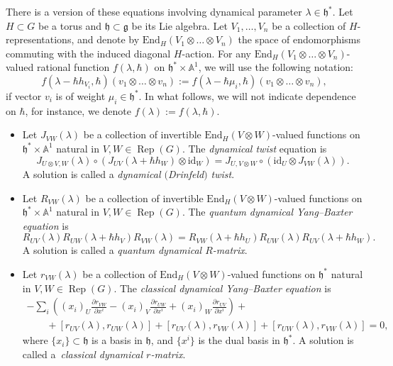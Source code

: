 \documentclass[pdftex]{sigma}
\numberwithin{equation}{section}
\newcommand{\g}{\mathfrak{g}}
\newcommand{\h}{\mathfrak{h}}
\newcommand{\End}{\mathrm{End}}
\newcommand{\id}{\mathrm{id}}
\DeclareMathOperator{\Rep}{Rep}
\begin{document}
	There is a version of these equations involving dynamical parameter $\lambda \in \h^*$. Let $H \subset G$ be a torus and $\h \subset \g$ be its Lie algebra. Let $V_1,\dots,V_n$ be a collection of $H$-representations, and denote by $\End_{H}(V_1 \otimes \dots \otimes V_n)$ the space of endomorphisms commuting with the induced diagonal $H$-action. For any $\End_{H}(V_1 \otimes \dots \otimes V_n)$-valued rational function $f(\lambda,\hbar)$ on $\h^*\times \mathbb{A}^1$, we will use the following notation:
	\[
	f(\lambda-\hbar h_{V_i},\hbar) (v_1 \otimes \dots \otimes v_n) := f(\lambda - \hbar \mu_i,\hbar) (v_1\otimes \dots \otimes v_n),
	\]
	if vector $v_i$ is of weight $\mu_i \in \h^*$. In what follows, we will not indicate dependence on $\hbar$, for instance, we denote $f(\lambda):=f(\lambda,\hbar)$.
	
	\begin{Definition}\qquad
		\label{def::all_dynamical}
		\begin{itemize}\itemsep=0pt
			\item Let $J_{VW}(\lambda)$ be a collection of invertible $\End_{H}(V \otimes W)$-valued functions on $\h^*\times \mathbb{A}^1$ natural in $V,W\in \Rep(G)$. The \emph{dynamical twist} equation is
			\begin{equation}
				\label{eq::dyn_twist}
				J_{U \otimes V,W}(\lambda) \circ (J_{UV}(\lambda+\hbar h_W) \otimes \id_W) = J_{U,V\otimes W} \circ (\id_U \otimes J_{VW}(\lambda)).
			\end{equation}
			A solution is called a \emph{dynamical $($Drinfeld$)$ twist}.
			\item Let $R_{VW}(\lambda)$ be a collection of invertible $\End_{H}(V \otimes W)$-valued functions on $\h^*\times \mathbb{A}^1$ natural in $V,W\in \Rep(G)$. The \emph{quantum dynamical Yang--Baxter equation} is
			\begin{equation}
				\label{eq::qdybe}
				R_{UV}(\lambda) R_{UW} (\lambda + \hbar h_V) R_{VW}(\lambda) = R_{VW}(\lambda+\hbar h_U) R_{UW}(\lambda) R_{UV}(\lambda + \hbar h_W).
			\end{equation}
			A solution is called a \emph{quantum dynamical $R$-matrix}.
			\item Let $r_{VW}(\lambda)$ be a collection of $\End_{H}(V \otimes W)$-valued functions on $\h^*$ natural in $V,W\in \Rep(G)$. The \emph{classical dynamical Yang--Baxter equation} is
			\begin{gather}
					-\sum\limits_i \left( (x_i)_{U} \frac{\partial r_{VW}}{\partial x^i} - (x_i)_V \frac{\partial r_{UW}}{\partial x^i} + (x_i)_W \frac{\partial r_{UV}}{\partial x^i}\right) +\nonumber \\
					\qquad{}+[r_{UV}(\lambda),r_{UW}(\lambda)] + [r_{UV}(\lambda),r_{VW}(\lambda)] + [r_{UW}(\lambda), r_{VW}(\lambda)] = 0,\label{eq::cdybe}
			\end{gather}
			where $\{x_i\} \subset \h$ is a basis in $\h$, and $\bigl\{x^i\bigr\}$ is the dual basis in $\h^*$. A solution is called a~\emph{classical dynamical $r$-matrix}.
		\end{itemize}
	\end{Definition}
	
\end{document}
